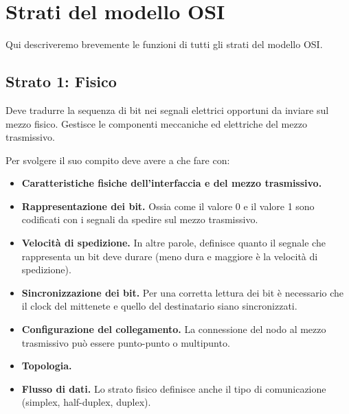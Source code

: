 \newpage
\section{Strati del modello OSI}
    Qui descriveremo brevemente le funzioni di tutti gli strati del modello OSI.

    \subsection{Strato 1: Fisico}
        Deve tradurre la sequenza di bit nei segnali elettrici opportuni da inviare sul mezzo fisico. Gestisce le componenti meccaniche ed elettriche del mezzo trasmissivo.
        
        Per svolgere il suo compito deve avere a che fare con:
        \begin{itemize}
            \item \textbf{Caratteristiche fisiche dell'interfaccia e del mezzo trasmissivo.}
            
            \item \textbf{Rappresentazione dei bit.} Ossia come il valore 0 e il valore 1 sono codificati con i segnali da spedire sul mezzo trasmissivo.
            
            \item \textbf{Velocità di spedizione.} In altre parole, definisce quanto il segnale che rappresenta un bit deve durare (meno dura e maggiore è la velocità di spedizione).
            
            \item \textbf{Sincronizzazione dei bit.} Per una corretta lettura dei bit è necessario che il clock del mittenete e quello del destinatario siano sincronizzati.
            
            \item \textbf{Configurazione del collegamento.} La connessione del nodo al mezzo trasmissivo può essere punto-punto o multipunto.
            
            \item \textbf{Topologia.}
            
            \item \textbf{Flusso di dati.} Lo strato fisico definisce anche il tipo di comunicazione (simplex, half-duplex, duplex).
        \end{itemize}
        

